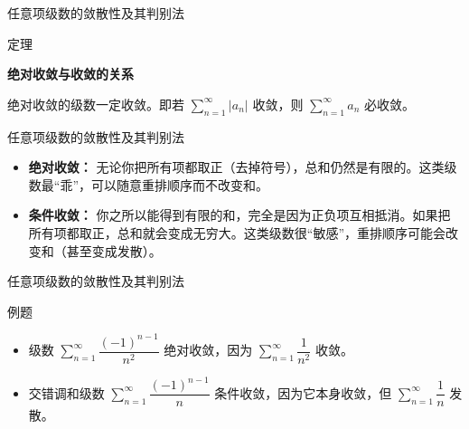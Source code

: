 \documentclass[aspectratio=169,10pt,fontset=fandol]{ctexbeamer}
\newenvironment{custom}[1]{\par\noindent\textbf{#1}\quad}{\par\vspace{0.8em}}
\begin{document}
\begin{frame}[t,fragile]{任意项级数的敛散性及其判别法}
\footnotesize
\begin{block}{定理}
{\footnotesize
\textbf{绝对收敛与收敛的关系}\par

	绝对收敛的级数一定收敛。即若 \(\sum\limits_{n = 1}^{  \infty } |a_n|\) 收敛，则 \(\sum\limits_{n = 1}^{  \infty } a_n\) 必收敛。

}
\end{block}
\end{frame}
\begin{frame}[t,fragile]{任意项级数的敛散性及其判别法}
\footnotesize
{\footnotesize
\begin{itemize}
		\item \textbf{绝对收敛：} 无论你把所有项都取正（去掉符号），总和仍然是有限的。这类级数最“乖”，可以随意重排顺序而不改变和。
		\item \textbf{条件收敛：} 你之所以能得到有限的和，完全是因为正负项互相抵消。如果把所有项都取正，总和就会变成无穷大。这类级数很“敏感”，重排顺序可能会改变和（甚至变成发散）。
	\end{itemize}

}
\end{frame}
\begin{frame}[t,fragile]{任意项级数的敛散性及其判别法}
\footnotesize
\begin{block}{例题}
{\footnotesize
\begin{itemize}
		\item 级数 \(\sum\limits_{n = 1}^{  \infty } \dfrac{(-1)^{n-1}}{n^2}\) 绝对收敛，因为 \(\sum\limits_{n = 1}^{  \infty } \dfrac{1}{n^2}\) 收敛。
		\item 交错调和级数 \(\sum\limits_{n = 1}^{  \infty } \dfrac{(-1)^{n-1}}{n}\) 条件收敛，因为它本身收敛，但 \(\sum\limits_{n = 1}^{  \infty } \dfrac{1}{n}\) 发散。
	\end{itemize}

}
\end{block}
\end{frame}
\end{document}
